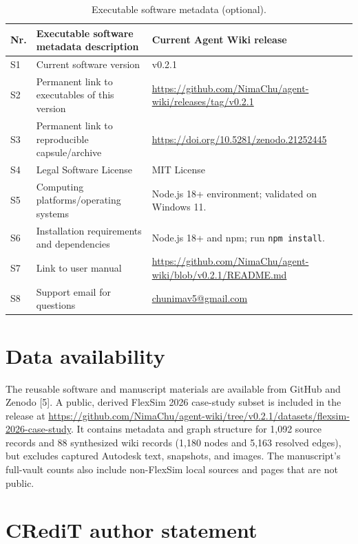 \documentclass[preprint,12pt,a4paper]{elsarticle}
\begin{document}
\begin{table}[!h]
\small
\begin{tabular}{|p{0.7cm}|p{5.1cm}|p{7.2cm}|}
\hline
\textbf{Nr.} & \textbf{Executable software metadata description} & \textbf{Current Agent Wiki release} \\
\hline
S1 & Current software version & v0.2.1 \\
\hline
S2 & Permanent link to executables of this version &
\url{https://github.com/NimaChu/agent-wiki/releases/tag/v0.2.1} \\
\hline
S3 & Permanent link to reproducible capsule/archive &
\url{https://doi.org/10.5281/zenodo.21252445} \\
\hline
S4 & Legal Software License & MIT License \\
\hline
S5 & Computing platforms/operating systems &
Node.js 18+ environment; validated on Windows 11. \\
\hline
S6 & Installation requirements and dependencies & Node.js 18+ and npm; run \texttt{npm install}. \\
\hline
S7 & Link to user manual &
\url{https://github.com/NimaChu/agent-wiki/blob/v0.2.1/README.md} \\
\hline
S8 & Support email for questions & \href{mailto:chunimav5@gmail.com}{chunimav5@gmail.com} \\
\hline
\end{tabular}
\caption{Executable software metadata (optional).}
\label{tab:software-metadata}
\end{table}

\section*{Data availability}

The reusable software and manuscript materials are available from GitHub and
Zenodo [5]. A public, derived FlexSim 2026 case-study subset is included in the
release at \url{https://github.com/NimaChu/agent-wiki/tree/v0.2.1/datasets/flexsim-2026-case-study}.
It contains metadata and graph structure for 1,092 source records and 88
synthesized wiki records (1,180 nodes and 5,163 resolved edges), but excludes
captured Autodesk text, snapshots, and images. The manuscript's full-vault
counts also include non-FlexSim local sources and pages that are not public.

\section*{CRediT author statement}
\end{document}
